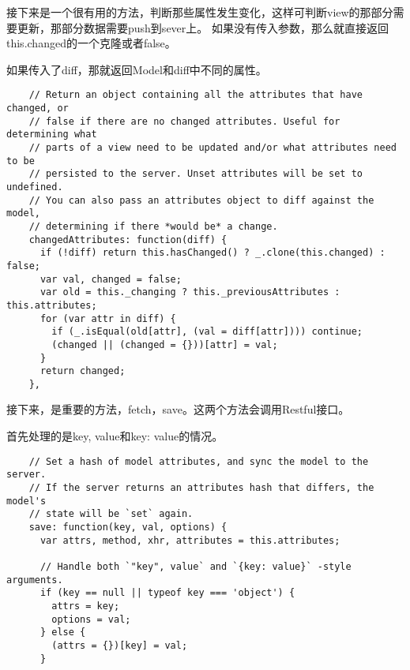   接下来是一个很有用的方法，判断那些属性发生变化，这样可判断view的那部分需要更新，那部分数据需要push到sever上。
  如果没有传入参数，那么就直接返回this.changed的一个克隆或者false。

  如果传入了diff，那就返回Model和diff中不同的属性。
  \begin{lstlisting}
    // Return an object containing all the attributes that have changed, or
    // false if there are no changed attributes. Useful for determining what
    // parts of a view need to be updated and/or what attributes need to be
    // persisted to the server. Unset attributes will be set to undefined.
    // You can also pass an attributes object to diff against the model,
    // determining if there *would be* a change.
    changedAttributes: function(diff) {
      if (!diff) return this.hasChanged() ? _.clone(this.changed) : false;
      var val, changed = false;
      var old = this._changing ? this._previousAttributes : this.attributes;
      for (var attr in diff) {
        if (_.isEqual(old[attr], (val = diff[attr]))) continue;
        (changed || (changed = {}))[attr] = val;
      }
      return changed;
    },
  \end{lstlisting}

  接下来，是重要的方法，fetch，save。这两个方法会调用Restful接口。

  首先处理的是key, value和{key: value}的情况。

  \begin{lstlisting}
    // Set a hash of model attributes, and sync the model to the server.
    // If the server returns an attributes hash that differs, the model's
    // state will be `set` again.
    save: function(key, val, options) {
      var attrs, method, xhr, attributes = this.attributes;

      // Handle both `"key", value` and `{key: value}` -style arguments.
      if (key == null || typeof key === 'object') {
        attrs = key;
        options = val;
      } else {
        (attrs = {})[key] = val;
      }
  \end{lstlisting}

